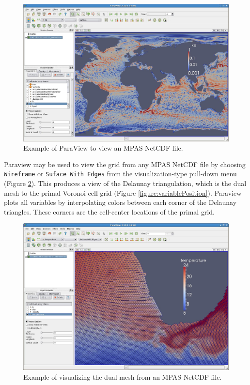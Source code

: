 \begin{figure}[htb]
\begin{center}
\includegraphics[width=6.5in]{shared/figures/ParaviewExample.jpg}
\caption{Example of ParaView to view an MPAS NetCDF file.}
\label{fig:ParaviewExample}
\end{center}
\end{figure}

Paraview may be used to view the grid from any MPAS NetCDF file by choosing {\tt Wireframe} or {\tt Suface With Edges} from the visualization-type pull-down menu (Figure \ref{fig:ParaviewExampleEdges}).  This produces a view of the Delaunay triangulation, which is the dual mesh to the primal Voronoi cell grid (Figure \ref{figure:variablePosition}).  Paraview plots all variables by interpolating colors between each corner of the Delaunay triangles.  These corners are the cell-center locations of the primal grid.

\begin{figure}[htb]
\begin{center}
\includegraphics[width=6.5in]{shared/figures/ParaviewExampleEdges.jpg}
\caption{Example of visualizing the dual mesh from an MPAS NetCDF file.}
\label{fig:ParaviewExampleEdges}
\end{center}
\end{figure}

